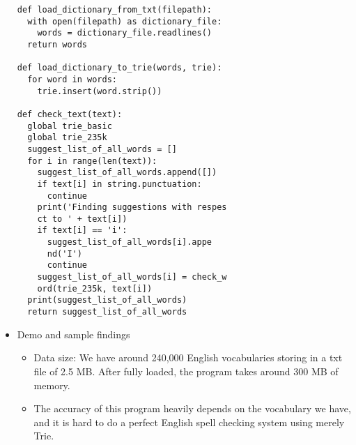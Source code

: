 \begin{itemize}
\begin{verbatim}
def load_dictionary_from_txt(filepath):
  with open(filepath) as dictionary_file:
    words = dictionary_file.readlines()
  return words

def load_dictionary_to_trie(words, trie):
  for word in words:
    trie.insert(word.strip())

def check_text(text):
  global trie_basic
  global trie_235k
  suggest_list_of_all_words = []
  for i in range(len(text)):
    suggest_list_of_all_words.append([])
    if text[i] in string.punctuation:
      continue
    print('Finding suggestions with respes
    ct to ' + text[i])
    if text[i] == 'i':
      suggest_list_of_all_words[i].appe
      nd('I')
      continue
    suggest_list_of_all_words[i] = check_w
    ord(trie_235k, text[i])
  print(suggest_list_of_all_words)
  return suggest_list_of_all_words
\end{verbatim}
\item{}
Demo and sample findings
\begin{itemize} 
\item{}
	Data size: We have around 240,000 English vocabularies storing in a txt file of 2.5 MB. After fully loaded, the program takes around 300 MB of memory.
\item{}
	The accuracy of this program heavily depends on the vocabulary we have, and it is hard to do a perfect English spell checking system using merely Trie.
\end{itemize}
\end{itemize}

